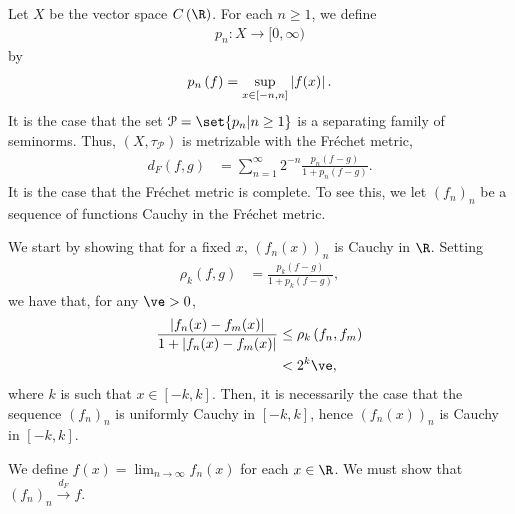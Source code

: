 \documentclass[10pt]{mypackage}
\begin{document}
\begin{example}
  Let $X$ be the vector space $C\left(\R\right)$. For each $n\geq 1$, we define
  \begin{align*}
    p_n: X\rightarrow [0,\infty)
  \end{align*}
  by
  \begin{align*}
    p_n\left(f\right) = \sup_{\tiny x\in [-n,n]}\left\vert f(x) \right\vert.
  \end{align*}
  It is the case that the set $\mathcal{P} = \set{p_n | n\geq 1}$ is a separating family of seminorms. Thus, $\left(X,\tau_{\mathcal{P}}\right)$ is metrizable with the Fréchet metric,
  \begin{align*}
    d_{F}\left(f,g\right) &= \sum_{n=1}^{\infty}2^{-n}\frac{p_n\left(f-g\right)}{1 + p_n\left(f-g\right)}.
  \end{align*}
  It is the case that the Fréchet metric is complete. To see this, we let $\left(f_n\right)_n$ be a sequence of functions Cauchy in the Fréchet metric.\newline

  We start by showing that for a fixed $x$, $\left(f_n(x)\right)_n$ is Cauchy in $\R$. Setting
  \begin{align*}
    \rho_{k}\left(f,g\right) &= \frac{p_k\left(f-g\right)}{1 + p_k\left(f-g\right)},
  \end{align*}
  we have that, for any $\ve > 0$,
  \begin{align*}
    \frac{\left\vert f_n(x)-f_m(x) \right\vert}{1 + \left\vert f_n(x) - f_m(x) \right\vert} &\leq \rho_{k}\left(f_n,f_m\right)\\
                                                                                            &< 2^{k}\ve,
  \end{align*}
  where $k$ is such that $x\in \left[-k,k\right]$. Then, it is necessarily the case that the sequence $\left(f_n\right)_n$ is uniformly Cauchy in $\left[-k,k\right]$, hence $\left(f_n(x)\right)_n$ is Cauchy in $\left[-k,k\right]$.\newline

  We define $f(x) = \lim_{n\rightarrow\infty}f_n(x)$ for each $x\in \R$. We must show that $\left(f_n\right)_n\xrightarrow{d_{F}} f$.\newline


\end{example}
\end{document}

